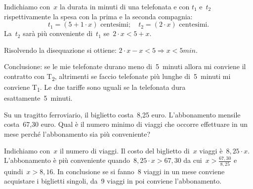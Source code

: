  \begin{soluzione}
 Indichiamo con~$x$ la durata in minuti di una telefonata e con
$t_{1}$ e~$t_{2}$ rispettivamente la spesa con
la prima e la seconda compagnia:
\[t_{1}=(5+1\cdot x)\text{ centesimi};\quad t_{2}=(2\cdot x)\text{ 
centesimi.}\]
La~$t_2$ sarà più conveniente di~$t_1$ se~$2\cdot x<5+x$.

Risolvendo la disequazione si ottiene:
$2\cdot x-x<5\Rightarrow x<5\unit{min}$.

Conclusione: se le mie telefonate durano meno di~5~minuti allora mi
conviene il contratto con T\textsubscript{2}, altrimenti se faccio
telefonate più lunghe di~5~minuti mi conviene T\textsubscript{1}. Le
due tariffe sono uguali se la telefonata dura esattamente~5~minuti.
 \end{soluzione}

 \begin{problema}[L'abbonamento]
 Su un tragitto ferroviario, il biglietto costa~8,25 euro.
L'abbonamento mensile costa~67,30 euro. Qual è il
numero minimo di viaggi che occorre effettuare in un mese perché
l'abbonamento sia più conveniente?
 \end{problema}

 \begin{soluzione}
 Indichiamo con~$x$ il numero di viaggi. Il costo del biglietto di~$x$ 
viaggi è~$8,25\cdot x$. L'abbonamento è più
conveniente quando~$8,25\cdot x>67,30$ da cui~$x>\frac{67,30}{8,25}$
e quindi~$x>8,16$. In conclusione se si fanno~8 viaggi in un
mese conviene acquistare i biglietti singoli, da~9 viaggi in poi
conviene l'abbonamento.
 \end{soluzione}




